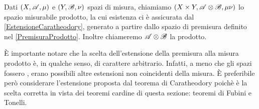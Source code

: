 \begin{definition}
	Dati $(X,\mathscr A,\mu)$ e $(Y,\mathscr B,\nu)$ spazi di misura, chiamiamo $(X\times Y,\mathscr A\otimes\mathscr B,\mu\nu)$ lo spazio misurabile prodotto, la cui esistenza ci è assicurata dal \cref{EstensioneCaratheodory}, generato a partire dallo spazio di premisura definito nel \cref{PremisuraProdotto}. Inoltre chiameremo $\mathscr A\otimes\mathscr B$ la \sigalg{} prodotto.
\end{definition}

È importante notare che la scelta dell'estensione della premisura alla misura prodotto è, in qualche senso, di carattere arbitrario. Infatti, a meno che gli spazi fossero \sigfin[i], erano possibili altre estensioni non coincidenti della misura. 
È preferibile però considerare l'estensione proposta dal teorema di Caratheodory poichè è la scelta corretta in vista dei teoremi cardine di questa sezione: teoremi di Fubini e Tonelli.
